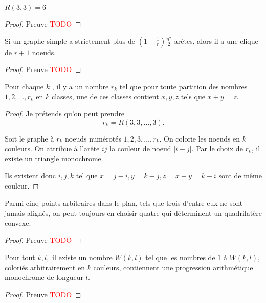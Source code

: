 \begin{mytheo} 
  $R(3, 3) = 6$
  \begin{proof}
     Preuve \textcolor{red}{TODO}
  \end{proof}
\end{mytheo}

\begin{mytheo} 
  Si un graphe simple a strictement plus de $(1 − \frac{1}{r}) \frac{n^2}{2}$ arêtes, alors il a une clique de $r + 1$ noeuds.
  \begin{proof}
     Preuve \textcolor{red}{TODO}
  \end{proof}
\end{mytheo}

\begin{mytheo} 
  Pour chaque $k$ , il y a un nombre $r_k$ tel que pour toute partition des nombres $1, 2, ..., r_k$ en $k$ classes, une de ces classes contient $x, y , z$ tels que $x + y = z$.
  \begin{proof}
    Je prétends qu'on peut prendre $$r_k = R(3,3,\ldots , 3).$$
    
    Soit le graphe à $r_k$ noeuds numérotés ${1, 2, 3, \ldots ,r_k }$. On colorie les noeuds en $k$ couleurs. On attribue à l'arête $ij$ la couleur de noeud $|i-j|$. Par le choix de $r_k$, il existe un triangle monochrome. 
    
    Ils existent donc $i,j,k$ tel que $x=j-i, y = k-j, z = x+y = k-i$ sont de même couleur.
  \end{proof}
\end{mytheo}

\begin{mytheo} 
  Parmi cinq points arbitraires dans le plan, tels que trois d’entre eux ne sont jamais alignés, on peut toujours en choisir quatre qui déterminent un quadrilatère convexe.
  \begin{proof}
     Preuve \textcolor{red}{TODO}
  \end{proof}
\end{mytheo}

\begin{mytheo} 
  Pour tout $k , l,$ il existe un nombre $W (k , l)$ tel que les nombres de $1$ à $W (k , l)$, coloriés arbitrairement en $k$ couleurs, contiennent une progression arithmétique monochrome de longueur $l$.
  \begin{proof}
     Preuve \textcolor{red}{TODO}
  \end{proof}
\end{mytheo}







